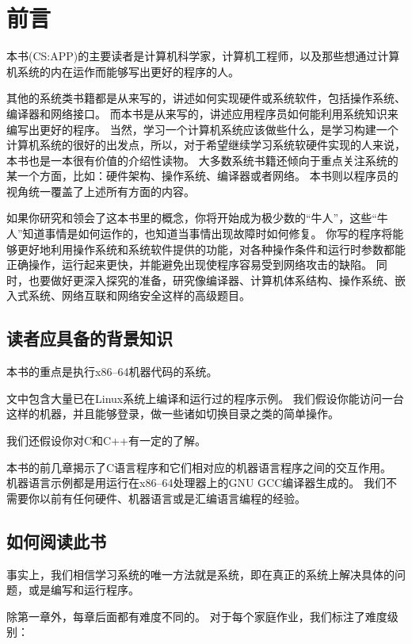 \chapter{前言}
{
    本书(CS:APP)的主要读者是计算机科学家，计算机工程师，以及那些想通过计算机系统的内在运作而能够写出更好的程序的人。

    其他的系统类书籍都是从来写的，讲述如何实现硬件或系统软件，包括操作系统、编译器和网络接口。
    而本书是从来写的，讲述应用程序员如何能利用系统知识来编写出更好的程序。
    当然，学习一个计算机系统应该做些什么，是学习构建一个计算机系统的很好的出发点，所以，对于希望继续学习系统软硬件实现的人来说，本书也是一本很有价值的介绍性读物。
    大多数系统书籍还倾向于重点关注系统的某一个方面，比如：硬件架构、操作系统、编译器或者网络。
    本书则以程序员的视角统一覆盖了上述所有方面的内容。

    如果你研究和领会了这本书里的概念，你将开始成为极少数的``牛人''，这些``牛人''知道事情是如何运作的，也知道当事情出现故障时如何修复。
    你写的程序将能够更好地利用操作系统和系统软件提供的功能，对各种操作条件和运行时参数都能正确操作，运行起来更快，并能避免出现使程序容易受到网络攻击的缺陷。
    同时，也要做好更深入探究的准备，研究像编译器、计算机体系结构、操作系统、嵌入式系统、网络互联和网络安全这样的高级题目。

    \section{读者应具备的背景知识}
    {
        本书的重点是执行x86--64机器代码的系统。

        文中包含大量已在Linux系统上编译和运行过的程序示例。
        我们假设你能访问一台这样的机器，并且能够登录，做一些诸如切换目录之类的简单操作。

        我们还假设你对C和C++有一定的了解。

        本书的前几章揭示了C语言程序和它们相对应的机器语言程序之间的交互作用。
        机器语言示例都是用运行在x86--64处理器上的GNU GCC编译器生成的。
        我们不需要你以前有任何硬件、机器语言或是汇编语言编程的经验。
    }

    \section{如何阅读此书}
    {
        事实上，我们相信学习系统的唯一方法就是系统，即在真正的系统上解决具体的问题，或是编写和运行程序。

        除第一章外，每章后面都有难度不同的。
        对于每个家庭作业，我们标注了难度级别：

}}
